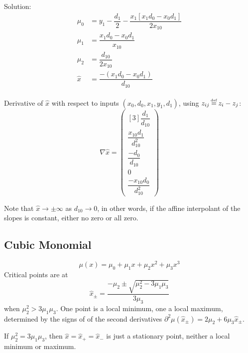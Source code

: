 Solution:
\begin{align}
\mu_0 & = 
y_1 
- 
\dfrac{d_1}{2}
-
\dfrac{x_1 \left[x_1 d_0 - x_0 d_1 \right]}{2 x_{10}}
\\
\mu_1 & =
\dfrac{x_1 d_0 - x_0 d_1}{x_{10}}
\nonumber
\\
\mu_2 & = \dfrac{d_{10}}{2 x_{10}}
\nonumber
\\
\hat{x} & = \dfrac{- \left( x_1 d_0 - x_0 d_1 \right)}{d_{10}}
\nonumber
\end{align}

Derivative of $\hat{x}$ with respect to inputs
$(x_0,d_0,x_1,y_1,d_1)$,
using $z_{ij} \operatorname*{\overset{\underset{\mathrm{def}}{}}{=}} z_i - z_j$:
\begin{equation}
\nabla \hat{x} =
\begin{pmatrix}[3]
\dfrac{d_1}{d_{10}}
\\
\dfrac{ x_{10} d_1}{d_{10}^{2}}
\\
\dfrac{- d_0}{d_{10}}
\\
0
\\
\dfrac{- x_{10} d_0}{d_{10}^{2}
}
\end{pmatrix}
\end{equation}
 
Note that $\hat{x} \to \pm \infty$ as $d_{10} \to 0$,
in other words,
if the affine interpolant of the slopes is constant,
either no zero or all zero.
% 

% 


\subsection{Cubic Monomial}

\begin{equation}
\mu(x) = \mu_0 + \mu_1 x + \mu_2 x^2 + \mu_3 x^3
\end{equation}
Critical points are at
\begin{equation}
\hat{x}_{\pm} = \frac{-\mu_2 \pm \sqrt{ \mu_2^{2} - 3 \mu_1 \mu_3 }}{3 \mu_3}
\end{equation}
when $\mu_2^{2} > 3 \mu_1 \mu_3$.
One point is a local minimum, one a local maximum, 
determined by the signs of of the second derivatives
$\partial^2\mu(\hat{x}_{\pm}) = 2 \mu_2 + 6 \mu_3 \hat{x}_{\pm}$.

If $\mu_2^{2} = 3 \mu_1 \mu_3$, 
then $\hat{x} = \hat{x}_{+} = \hat{x}_{-}$ is just a stationary
point, neither a local minimum or maximum.

